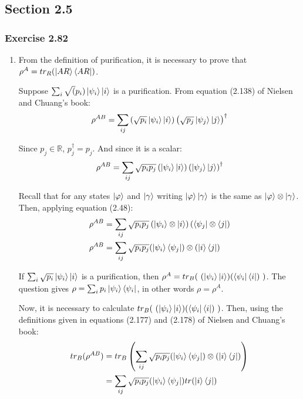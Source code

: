 \subsection{Section 2.5}
\subsubsection{Exercise 2.82}

\begin{enumerate}
\item From the definition of purification, it is necessary to prove that $\rho^A = tr_R(\ket{AR}\bra{AR})$.

Suppose $\sum_i \sqrt(p_i) \ket{\psi_i} \ket{i}$ is a purification. From equation (2.138) of Nielsen and Chuang's book:
\begin{align}
    \rho^{AB} = \sum_{ij} \left( \sqrt{p_i} \ket{\psi_i} \ket{i} \right) \left( \sqrt{p_j} \ket{\psi_j} \ket{j} \right) ^ \dagger
\end{align}

Since $p_j \in \mathbb{R}$, $p_j^\dagger = p_j$. And since it is a scalar:
\begin{align}
    \rho^{AB} = \sum_{ij} \sqrt{p_i p_j} \left( \ket{\psi_i} \ket{i} \right) \left( \ket{\psi_j} \ket{j} \right) ^ \dagger
\end{align}

Recall that for any states $\ket{\varphi}$ and $\ket{\gamma}$ writing $\ket{\varphi} \ket{\gamma}$ is the same as $\ket{\varphi} \otimes \ket{\gamma}$. Then, applying equation (2.48):
\begin{align}
    \rho^{AB} &= \sum_{ij} \sqrt{p_i p_j} \left( \ket{\psi_i} \otimes \ket{i} \right)
        \left( \bra{\psi_j} \otimes \bra{j} \right) \\
    \rho^{AB} &= \sum_{ij} \sqrt{p_i p_j} (\ket{\psi_i}\bra{\psi_j}) \otimes (\ket{i}\bra{j})
\end{align}

If $\sum_i \sqrt{p_i} \ket{\psi_i}\ket{i}$ is a purification, then
$\rho^A = tr_B(\ (\ket{\psi_i}\ket{i}) (\bra{\psi_i}\bra{i})\ )$.
The question gives $\rho = \sum_i p_i \ket{\psi_i}\bra{\psi_i}$, in other words $\rho = \rho^A$.

Now, it is necessary to calculate $tr_B(\ (\ket{\psi_i}\ket{i}) (\bra{\psi_i}\bra{i})\ )$. Then, using the definitions given in equations (2.177) and (2.178) of Nielsen and Chuang's book:
\begin{align}
    tr_B(\rho^{AB}) &= tr_B \left(\sum_{ij} \sqrt{p_i p_j} (\ket{\psi_i}\bra{\psi_j}) \otimes (\ket{i}\bra{j}) \right) \\
    &= \sum_{ij} \sqrt{p_i p_j} (\ket{\psi_i}\bra{\psi_j}) tr(\ket{i}\bra{j})
\end{align}


\end{enumerate}
